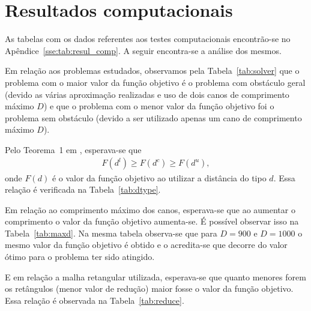 \section{Resultados computacionais}
As tabelas com os dados referentes aos testes computacionais encontrão-se no
Apêndice~\ref{sse:tab:resul_comp}. A seguir encontra-se a análise dos mesmos.

Em relação aos problemas estudados, observamos pela Tabela~\ref{tab:solver} que
o problema com o maior valor da função objetivo é o problema com obstáculo geral
(devido as várias aproximação realizadas e uso de dois canos de comprimento
máximo $D$) e que o problema com o menor valor da função objetivo foi o problema
sem obstáculo (devido a ser utilizado apenas um cano de comprimento máximo $D$).

Pelo Teorema~1 em \cite{Andjel:1989:TP}, esperava-se que 
\begin{align*}
    F(d^l) \geq F(d^c) \geq F(d^u),
\end{align*}
onde $F(d)$ é o valor da função objetivo ao utilizar a distância do tipo $d$.
Essa relação é verificada na Tabela~\ref{tab:dtype}.

Em relação ao comprimento máximo dos canos, esperava-se que ao aumentar o
comprimento o valor da função objetivo aumenta-se. É possível observar isso na
Tabela~\ref{tab:maxd}. Na mesma tabela observa-se que para $D = 900$ e $D =
1000$ o mesmo valor da função objetivo é obtido e o acredita-se que decorre do
valor ótimo para o problema ter sido atingido.

E em relação a malha retangular utilizada, esperava-se que quanto menores forem
os retângulos (menor valor de redução) maior fosse o valor da função objetivo.
Essa relação é observada na Tabela~\ref{tab:reduce}.
